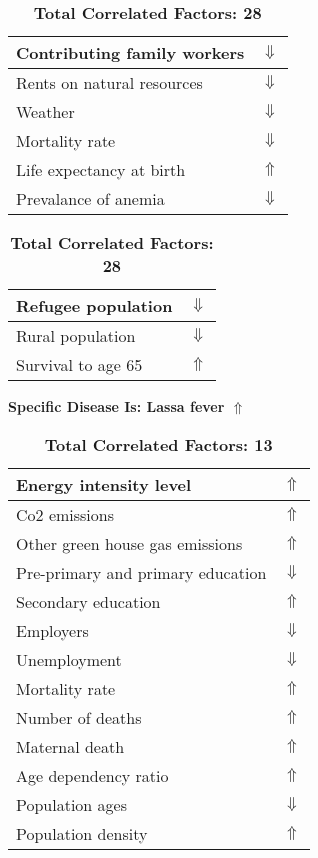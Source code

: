 \documentclass[12pt,notitlepage,oneside]{report}
\begin{document}
\begin{table}[!htb]
\begin{tabular}{|l|l|}
Contributing family workers & $\Downarrow$\\ \hline
Rents on natural resources & $\Downarrow$\\ \hline
Weather & $\Downarrow$\\ \hline
Mortality rate & $\Downarrow$\\ \hline
Life expectancy at birth & $\Uparrow$\\ \hline
Prevalance of anemia & $\Downarrow$\\ \hline
\end{tabular}
\begin{tabular}{|l|l|}
\hline
Refugee population & $\Downarrow$\\ \hline
Rural population & $\Downarrow$\\ \hline
Survival to age 65 & $\Uparrow$\\ \hline
\end{tabular}
\caption*{\textbf{Total Correlated Factors: 28}}
\end{table}
\clearpage
\begin{table}[!htb]
\caption{\textbf{Specific Disease Is: Lassa fever $\Uparrow$}}
\centering
\label{Correlated Socio-economic Factors0}
\begin{tabular}{|l|l|}
\hline
Energy intensity level & $\Uparrow$\\ \hline
Co2 emissions & $\Uparrow$\\ \hline
Other green house gas emissions & $\Uparrow$\\ \hline
Pre-primary and primary education & $\Downarrow$\\ \hline
Secondary education & $\Uparrow$\\ \hline
Employers & $\Downarrow$\\ \hline
Unemployment & $\Downarrow$\\ \hline
Mortality rate & $\Uparrow$\\ \hline
Number of deaths & $\Uparrow$\\ \hline
Maternal death & $\Uparrow$\\ \hline
Age dependency ratio & $\Uparrow$\\ \hline
Population ages & $\Downarrow$\\ \hline
Population density & $\Uparrow$\\ \hline
\end{tabular}
\caption*{\textbf{Total Correlated Factors: 13}}
\end{table}
\end{document}
